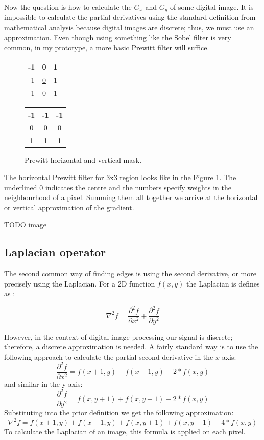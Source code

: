 \documentclass[
  digital,     %
  oneside,     %
  nosansbold,  %
  nocolorbold, %
  lof,         %
  lot,         %
]{fithesis4}
\begin{document}
Now the question is how to calculate the $G_x$ and $G_y$ of some digital image.
It is impossible to calculate the partial derivatives using the standard
definition from mathematical analysis because digital images are discrete; thus,
we must use an approximation. Even though using something like the Sobel filter
is very common, in my prototype, a more basic Prewitt filter will suffice.
\begin{figure}
    \begin{center}
        \begin{tabular}{ |c|c|c| }
            \hline
            -1 & 0 & 1 \\
            \hline
            -1 & \underline{0} & 1 \\
            \hline
            -1 & 0 & 1 \\
            \hline
        \end{tabular}
        \begin{tabular}{ |c|c|c| }
            \hline
            -1 & -1 & -1 \\
            \hline
            0 & \underline{0} & 0 \\
            \hline
            1 & 1 & 1 \\
            \hline
        \end{tabular}
    \end{center}
    \caption{Prewitt horizontal and vertical mask.}
    \label{table:prewitt}
\end{figure}
The horizontal Prewitt filter for 3x3 region looks like in the Figure
\ref{table:prewitt}.
The underlined 0 indicates the centre and the numbers specify weights in the
neighbourhood of a pixel. Summing them all together we arrive at the horizontal or
vertical approximation of the gradient.

TODO image

\subsection{Laplacian operator}

The second common way of finding edges is using the second derivative, or more
precisely using the Laplacian. For a 2D function $f(x, y)$ the Laplacian is
defines as \parencite{gonzalez2002}:

$$\nabla^2 f = \frac{\partial^2 f}{\partial x^2} + \frac{\partial^2 f}{\partial y^2}$$

However, in the context of digital image processing our signal is discrete;
therefore, a discrete approximation is needed. A fairly standard way is to use
the following approach to calculate the partial second derivative in the $x$
axis:
$$\frac{\partial^2 f}{\partial x^2} = f(x + 1, y) + f(x - 1, y) - 2*f(x, y)$$
and similar in the y axis:
$$\frac{\partial^2 f}{\partial y^2} = f(x, y + 1) + f(x, y - 1) - 2*f(x, y)$$
Substituting into the prior definition we get the following approximation:
$$\nabla^2 f = f(x+1, y) + f(x-1, y) + f(x, y+1) + f(x, y-1) - 4*f(x,y)$$
To calculate the Laplacian of an image, this formula is applied on each pixel.
\end{document}
